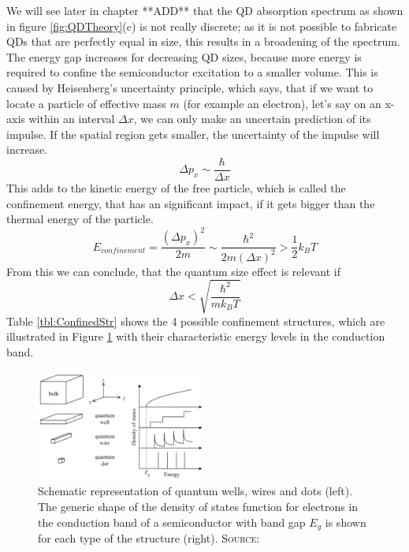 		
		We will see later in chapter **ADD** that the \gls{QD} absorption spectrum as shown in figure \ref{fig:QDTheory}(c) is not really discrete; as it is
		not possible to fabricate \glspl{QD} that are perfectly equal in size, this results in a broadening of the spectrum.
		The energy gap increases for decreasing \gls{QD} sizes, because more energy is required to confine the semiconductor excitation to a smaller volume.
		This is caused by Heisenberg's uncertainty principle, which says, that if we want to locate a particle of effective mass $m$ (for example an electron), let's say on an
		x-axis within an interval	$\Delta x$, we can only make an uncertain prediction of its impulse. If the spatial region gets smaller, the uncertainty
		of the impulse will	increase.
		\begin{equation}
			\Delta p_{x} \sim \frac{\hbar}{\Delta x}
		\end{equation}
		This adds to the kinetic energy of the free particle, which is called the confinement energy, that has an significant impact, if it gets bigger
		than the thermal energy of the particle.
		\begin{equation}
			E_{confinement} = \frac{(\Delta p_{x})^2}{2 m} \sim \frac{\hbar^2}{2 m (\Delta x)^2} > \frac{1}{2} k_{B} T
		\end{equation}
		From this we can conclude, that the quantum size effect is relevant if
		\begin{equation}
			\Delta x < \sqrt{\frac{\hbar^2}{m k_{B} T}}
		\end{equation}
		Table \ref{tbl:ConfinedStr} shows the 4 possible confinement structures, which are illustrated in Figure \ref{fig:ConfinedStr} with their
		characteristic energy levels in	the conduction band.

		\begin{figure}[htbp]		
		\centering
		\includegraphics[width=0.5\textwidth]{Fig/ConfinedStructures.pdf}
		\caption{Schematic representation of quantum wells, wires and dots (left).
						 The generic shape of the density of states function for electrons in the
						 conduction band of a semiconductor with band gap $E_{g}$ is shown for each
						 type of the structure (right).
						 {\scshape Source:} \cite[p.143]{Fox}}
		\label{fig:ConfinedStr}
	\end{figure}
		
